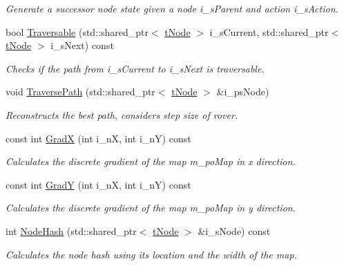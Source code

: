 \begin{DoxyCompactItemize}
\begin{DoxyCompactList}\small\item\em Generate a successor node state given a node i\+\_\+s\+Parent and action i\+\_\+s\+Action. \end{DoxyCompactList}\item 
bool \mbox{\hyperlink{classplanner_1_1c_planner_ab17c52bf6dd433b8f392a5bf2bc4b9a1}{Traversable}} (std\+::shared\+\_\+ptr$<$ \mbox{\hyperlink{structplanner_1_1t_node}{t\+Node}} $>$ i\+\_\+s\+Current, std\+::shared\+\_\+ptr$<$ \mbox{\hyperlink{structplanner_1_1t_node}{t\+Node}} $>$ i\+\_\+s\+Next) const
\begin{DoxyCompactList}\small\item\em Checks if the path from i\+\_\+s\+Current to i\+\_\+s\+Next is traversable. \end{DoxyCompactList}\item 
void \mbox{\hyperlink{classplanner_1_1c_planner_a8624cb2afb8f2fd216c38b4424013178}{Traverse\+Path}} (std\+::shared\+\_\+ptr$<$ \mbox{\hyperlink{structplanner_1_1t_node}{t\+Node}} $>$ \&i\+\_\+ps\+Node)
\begin{DoxyCompactList}\small\item\em Reconstructs the best path, considers step size of rover. \end{DoxyCompactList}\item 
\mbox{\label{classplanner_1_1c_planner_aa90d751ce544870e4c89494e06fdac6c}} 
const int \mbox{\hyperlink{classplanner_1_1c_planner_aa90d751ce544870e4c89494e06fdac6c}{GradX}} (int i\+\_\+nX, int i\+\_\+nY) const
\begin{DoxyCompactList}\small\item\em Calculates the discrete gradient of the map m\+\_\+po\+Map in x direction. \end{DoxyCompactList}\item 
\mbox{\label{classplanner_1_1c_planner_a6fd8e8632d78d85ce472322267ba7b36}} 
const int \mbox{\hyperlink{classplanner_1_1c_planner_a6fd8e8632d78d85ce472322267ba7b36}{GradY}} (int i\+\_\+nX, int i\+\_\+nY) const
\begin{DoxyCompactList}\small\item\em Calculates the discrete gradient of the map m\+\_\+po\+Map in y direction. \end{DoxyCompactList}\item 
int \mbox{\hyperlink{classplanner_1_1c_planner_a4c99873ce64b214899d65eda6366455f}{Node\+Hash}} (std\+::shared\+\_\+ptr$<$ \mbox{\hyperlink{structplanner_1_1t_node}{t\+Node}} $>$ \&i\+\_\+s\+Node) const
\begin{DoxyCompactList}\small\item\em Calculates the node hash using its location and the width of the map. \end{DoxyCompactList}\end{DoxyCompactItemize}
